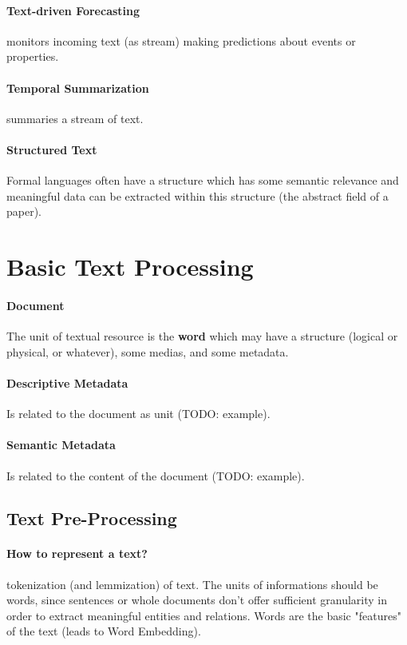 \paragraph{Text-driven Forecasting} monitors incoming text (as stream) making predictions about events or properties.

\paragraph{Temporal Summarization} summaries a stream of text.

\paragraph{Structured Text} Formal languages often have a structure which has some semantic relevance and meaningful data can be extracted within this structure (the abstract field of a paper).

\section{Basic Text Processing}

\paragraph{Document} The unit of textual resource is the \textbf{word} which may have a structure (logical or physical, or whatever), some medias, and some metadata.

\paragraph{Descriptive Metadata} Is related to the document as unit (TODO: example).

\paragraph{Semantic Metadata} Is related to the content of the document (TODO: example).

\subsection{Text Pre-Processing}

\paragraph{How to represent a text?} tokenization (and lemmization) of text. The units of informations should be words, since sentences or whole documents don't offer sufficient granularity in order to extract meaningful entities and relations. Words are the basic "features" of the text (leads to Word Embedding).

